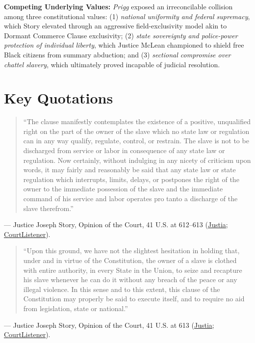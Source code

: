 \documentclass[12pt]{article}
\begin{document}
\textbf{Competing Underlying Values:} \textit{Prigg} exposed an irreconcilable collision among three constitutional values: (1) \textit{national uniformity and federal supremacy}, which Story elevated through an aggressive field-exclusivity model akin to Dormant Commerce Clause exclusivity; (2) \textit{state sovereignty and police-power protection of individual liberty}, which Justice McLean championed to shield free Black citizens from summary abduction; and (3) \textit{sectional compromise over chattel slavery}, which ultimately proved incapable of judicial resolution.

\section{Key Quotations}

\begin{quote}
``The clause manifestly contemplates the existence of a positive, unqualified right on the part of the owner of the slave which no state law or regulation can in any way qualify, regulate, control, or restrain. The slave is not to be discharged from service or labor in consequence of any state law or regulation. Now certainly, without indulging in any nicety of criticism upon words, it may fairly and reasonably be said that any state law or state regulation which interrupts, limits, delays, or postpones the right of the owner to the immediate possession of the slave and the immediate command of his service and labor operates pro tanto a discharge of the slave therefrom.''
\end{quote}
\noindent--- Justice Joseph Story, Opinion of the Court, 41 U.S. at 612--613 (\href{https://supreme.justia.com/cases/federal/us/41/539/}{Justia}; \href{https://www.courtlistener.com/opinion/86231/prigg-v-pennsylvania/}{CourtListener}).

\begin{quote}
``Upon this ground, we have not the slightest hesitation in holding that, under and in virtue of the Constitution, the owner of a slave is clothed with entire authority, in every State in the Union, to seize and recapture his slave whenever he can do it without any breach of the peace or any illegal violence. In this sense and to this extent, this clause of the Constitution may properly be said to execute itself, and to require no aid from legislation, state or national.''
\end{quote}
\noindent--- Justice Joseph Story, Opinion of the Court, 41 U.S. at 613 (\href{https://supreme.justia.com/cases/federal/us/41/539/}{Justia}; \href{https://www.courtlistener.com/opinion/86231/prigg-v-pennsylvania/}{CourtListener}).
\end{document}
